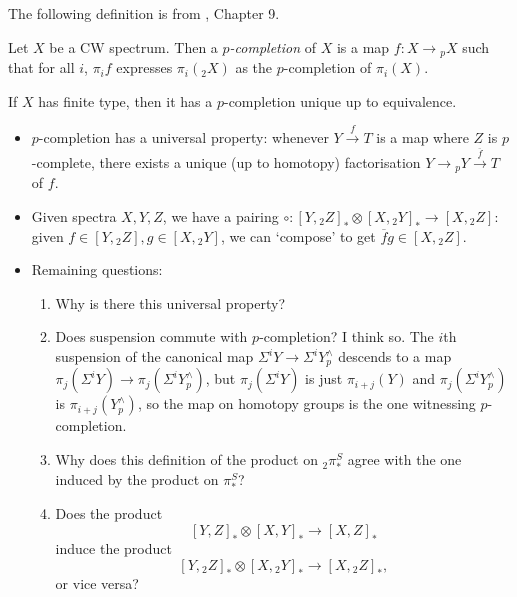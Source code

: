\documentclass{MetricNotes2023}
\begin{document}
The following definition is from \autocite{spectra}, Chapter 9.

\begin{definition}
Let \(X\) be a CW spectrum. Then a \textit{\(p\)-completion} of \(X\) is a map \(f : X \to \text{}_pX\) such that for all \(i\), \(\pi_if\) expresses \(\pi_i(\text{}_2X)\) as the \(p\)-completion of \(\pi_i(X)\).
\end{definition}

\begin{theorem}
If \(X\) has finite type, then it has a \(p\)-completion unique up to equivalence. 
\end{theorem}

\begin{itemize}
\item \(p\)-completion has a universal property: whenever \(Y \xrightarrow{f} T\) is a map where \(Z\) is \(p\)-complete, there exists a unique (up to homotopy) factorisation \(Y\to \text{}_pY \xrightarrow{\overline f} T\) of \(f\). 

\item Given spectra \(X, Y, Z\), we have a pairing \(\circ : [Y, \text{}_2Z]_* \otimes [X,\text{}_2Y]_* \to [X, \text{}_2Z]\): given \(f \in [Y, \text{}_2Z], g \in [X, \text{}_2Y]\), we can `compose' to get \(\overline fg\in [X, \text{}_2Z]\). 

\item Remaining questions: \begin{enumerate}
\item Why is there this universal property? 

\item Does suspension commute with \(p\)-completion? I think so. The \(i\)th suspension of the canonical map \(\Sigma^i Y \to \Sigma^iY^\wedge_p\) descends to a map \(\pi_j(\Sigma^iY)\to \pi_j(\Sigma^iY^\wedge_p)\), but \(\pi_j(\Sigma^iY)\) is just \(\pi_{i+j}(Y)\) and \(\pi_{j}(\Sigma^i Y^\wedge_p)\) is \(\pi_{i+j}(Y^\wedge_p)\), so the map on homotopy groups is the one witnessing \(p\)-completion. 

\item Why does this definition of the product on \(\text{}_2\pi_*^S\) agree with the one induced by the product on \(\pi_*^S\)?

\item Does the product
\[[Y, Z]_*\otimes [X, Y]_*\to [X, Z]_*\]
induce the product
\[[Y, \text{}_2Z]_*\otimes [X, \text{}_2Y]_*\to [X, \text{}_2Z]_*,\]
or vice versa?


\end{enumerate}
\end{itemize}
\end{document}
